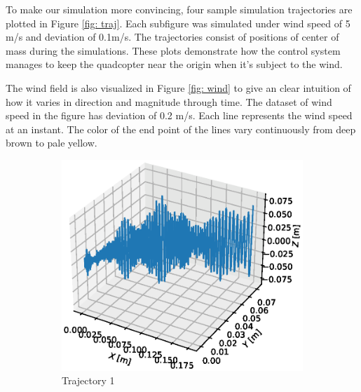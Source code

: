 To make our simulation more convincing, four sample simulation trajectories are plotted in Figure \ref{fig: traj}. Each subfigure was simulated under wind speed of 5 m/s and deviation of 0.1m/s. The trajectories consist of positions of center of mass during the simulations. These plots demonstrate how the control system manages to keep the quadcopter near the origin when it's subject to the wind. 

The wind field is also visualized in Figure \ref{fig: wind} to give an clear intuition of how it varies in direction and magnitude through time. The dataset of wind speed in the figure has deviation of 0.2 m/s. Each line represents the wind speed at an instant. The color of the end point of the lines vary continuously from deep brown to pale yellow.

\begin{figure}[H]
\begin{subfigure}{.5\textwidth}
\centering
\includegraphics[width=\linewidth]{Images/trajectory 1.eps}
\caption{Trajectory 1}
\end{subfigure}
\hfill
\begin{subfigure}{.5\textwidth}
\centering

\end{subfigure}
\end{figure}
